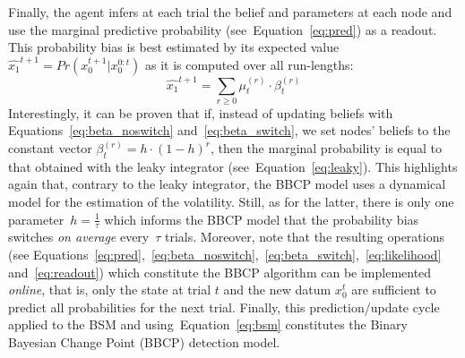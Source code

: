 \documentclass[12pt,english]{article}%
\newcommand{\eql}[1]{\begin{equation}#1\end{equation}}
\DeclareMathOperator{\argmax}{argmax}
\newcommand{\seeEq}[1]{Equation~\ref{eq:#1}}
\begin{document}
Finally, the agent infers at each trial the belief and parameters at each node
and use the marginal predictive probability (see~\seeEq{pred}) as a readout.
This probability bias is best estimated by its expected value $\hat{x_1}^{t+1}=Pr(x_0^{t+1} | x_0^{0:t})$
as it is computed over all run-lengths:
\eql{
\hat{x_1}^{t+1} = \sum_{r \geq 0} \mu^{(r)}_{t} \cdot \beta^{(r)}_{t}
\label{eq:readout}
}
Interestingly, it can be proven that if,
instead of updating beliefs with Equations~\ref{eq:beta_noswitch} and~\ref{eq:beta_switch},
we set nodes' beliefs to the constant vector $\beta^{(r)}_t = h \cdot (1 -h) ^r$, 
then the marginal probability is equal to that obtained with the leaky integrator (see~\seeEq{leaky}).
This highlights again that, contrary to the leaky integrator, %
the BBCP model uses a dynamical model for the estimation of the volatility.
Still, as for the latter, there is only one parameter~$h=\frac 1 \tau$ which informs the BBCP model
that the probability bias switches \emph{on average} every~$\tau$ trials.
Moreover, note that the resulting operations
(see Equations~\ref{eq:pred},~\ref{eq:beta_noswitch},~\ref{eq:beta_switch},~\ref{eq:likelihood} and~\ref{eq:readout})
which constitute the BBCP algorithm
can be implemented \textit{online}, that is,
only the state at trial $t$ and the new datum $x_0^t$
are sufficient to predict all probabilities for the next trial.
Finally, this prediction/update cycle applied to the BSM and using~\seeEq{bsm}
constitutes the Binary Bayesian Change Point (BBCP) detection model.

\end{document}
